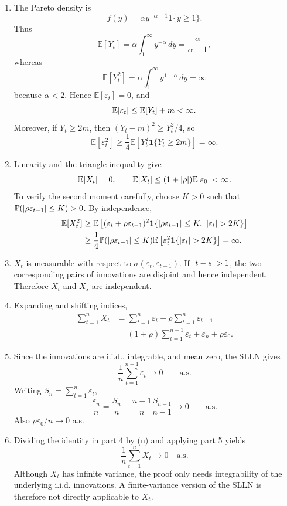 \documentclass[11pt]{article}
\newcommand{\bbE}{\mathbb{E}}
\newcommand{\bbP}{\mathbb{P}}
\newcommand{\ind}{\mathbf{1}}
\DeclarePairedDelimiter{\abs}{\lvert}{\rvert}
\begin{document}
\begin{enumerate}
\item The Pareto density is
\[
f(y)=\alpha y^{-\alpha-1}\ind\{y\geq1\}.
\]
Thus
\[
\bbE[Y_t]
=\alpha\int_1^\infty y^{-\alpha}\,dy
=\frac{\alpha}{\alpha-1},
\]
whereas
\[
\bbE[Y_t^2]
=\alpha\int_1^\infty y^{1-\alpha}\,dy
=\infty
\]
because $\alpha<2$. Hence $\bbE[\varepsilon_t]=0$, and
\[
\bbE\abs{\varepsilon_t}
\leq \bbE[Y_t]+m<\infty.
\]
Moreover, if $Y_t\geq2m$, then $(Y_t-m)^2\geq Y_t^2/4$, so
\[
\bbE[\varepsilon_t^2]
\geq \frac14\bbE\left[Y_t^2\ind\{Y_t\geq2m\}\right]
=\infty.
\]

\item Linearity and the triangle inequality give
\[
\bbE[X_t]=0,
\qquad
\bbE\abs{X_t}
\leq(1+\abs{\rho})\bbE\abs{\varepsilon_0}<\infty.
\]
To verify the second moment carefully, choose $K>0$ such that
$\bbP(\abs{\rho\varepsilon_{t-1}}\leq K)>0$. By independence,
\[
\begin{aligned}
\bbE[X_t^2]
&\geq
\bbE\left[(\varepsilon_t+\rho\varepsilon_{t-1})^2
\ind\{\abs{\rho\varepsilon_{t-1}}\leq K,\ \abs{\varepsilon_t}>2K\}\right]\\
&\geq
\frac14\bbP(\abs{\rho\varepsilon_{t-1}}\leq K)
\bbE\left[\varepsilon_t^2\ind\{\abs{\varepsilon_t}>2K\}\right]
=\infty.
\end{aligned}
\]

\item $X_t$ is measurable with respect to
$\sigma(\varepsilon_t,\varepsilon_{t-1})$. If $\abs{t-s}>1$, the
two corresponding pairs of innovations are disjoint and hence independent.
Therefore $X_t$ and $X_s$ are independent.

\item Expanding and shifting indices,
\[
\begin{aligned}
\sum_{t=1}^nX_t
&=\sum_{t=1}^n\varepsilon_t
+\rho\sum_{t=1}^n\varepsilon_{t-1}\\
&=(1+\rho)\sum_{t=1}^{n-1}\varepsilon_t
+\varepsilon_n+\rho\varepsilon_0.
\end{aligned}
\]

\item Since the innovations are i.i.d., integrable, and mean zero, the SLLN gives
\[
\frac1n\sum_{t=1}^{n-1}\varepsilon_t\longrightarrow0
\qquad\text{a.s.}
\]
Writing $S_n=\sum_{t=1}^n\varepsilon_t$,
\[
\frac{\varepsilon_n}{n}
=\frac{S_n}{n}-\frac{n-1}{n}\frac{S_{n-1}}{n-1}\longrightarrow0
\qquad\text{a.s.}
\]
Also $\rho\varepsilon_0/n\to0$ a.s.

\item Dividing the identity in part 4 by (n) and applying part 5 yields
\[
\boxed{\frac1n\sum_{t=1}^nX_t\longrightarrow0\quad\text{a.s.}}
\]
Although $X_t$ has infinite variance, the proof only needs integrability of
the underlying i.i.d. innovations. A finite-variance version of the SLLN is
therefore not directly applicable to $X_t$.
\end{enumerate}
\end{document}
